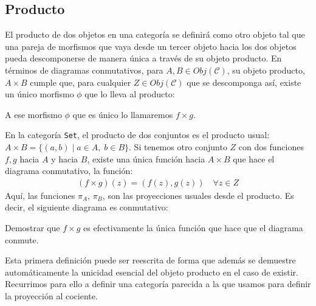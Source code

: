 \documentclass[11pt, fleqn, spanish]{book}
\newcommand{\C}{\mathcal{C} }
\begin{document}
  \subsection{Producto}
    El producto de dos objetos en una categoría se definirá como otro objeto tal
    que una pareja de morfismos que vaya desde un tercer objeto hacia los dos objetos pueda descomponerse
    de manera única a través de su objeto producto.
    En términos de diagramas conmutativos, para $A,B \in Obj(\C)$, su objeto producto,
    $A \times B$ cumple que, para cualquier $Z \in Obj(\C)$ que se descomponga así,
    existe un único morfismo $\phi$ que lo lleva al producto:
    \begin{center}
    \end{center}
    A ese morfismo $\phi$ que es único lo llamaremos $f \times g$.
    
    \begin{example} 
      En la categoría \texttt{Set}, el producto de dos conjuntos es el producto
      usual: $A \times B = \{(a,b) \; | \; a \in A, \; b \in B \}$. Si tenemos otro conjunto $Z$
      con dos funciones $f,g$ hacia $A$ y hacia $B$, existe una única función hacia $A \times B$
      que hace el diagrama conmutativo, la función:
      \begin{gather*}
      (f \times g)(z) = (f(z),g(z)) \quad \forall z \in Z
      \end{gather*}
      Aquí, las funciones $\pi_A$, $\pi_B$, son las proyecciones usuales desde el producto.
      Es decir, el siguiente diagrama es conmutativo:
      \begin{center}
      \end{center}
    \end{example}
    
    \begin{exercise} 
      Demostrar que $f \times g$ es efectivamente la única función que hace que el
      diagrama conmute.
    \end{exercise}

    
    Esta primera definición puede ser reescrita de forma que además se demuestre automáticamente
    la unicidad esencial del objeto producto en el caso de existir. Recurrimos para ello a
    definir una categoría parecida a la que usamos para definir la proyección al cociente.
  
\end{document}
